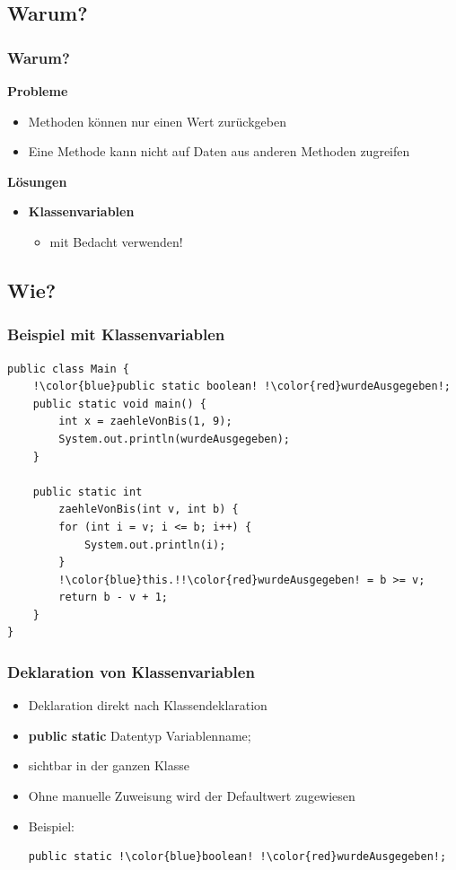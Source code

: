 \documentclass[final]{beamer}
\begin{document}
\subsection{Warum?}
\begin{frame}
	\frametitle{Warum?}
	\textbf{Probleme}
	\begin{itemize}
		\item{Methoden können nur einen Wert zurückgeben}
		\item{Eine Methode kann nicht auf Daten aus anderen Methoden zugreifen}
	\end{itemize}
	\vspace{\baselineskip}
	\pause
	\textbf{Lösungen}
	\pause
	\begin{itemize}
		\item{\textbf{Klassenvariablen}
			\begin{itemize}
				\item{mit Bedacht verwenden!}
			\end{itemize}
		}
	\end{itemize}
\end{frame}
	
\subsection{Wie?}
\begin{frame}[containsverbatim]
	\frametitle{Beispiel mit Klassenvariablen}
	\begin{lstlisting}[escapechar=!]
public class Main {
	!\color{blue}public static boolean! !\color{red}wurdeAusgegeben!;
	public static void main() {
		int x = zaehleVonBis(1, 9);
		System.out.println(wurdeAusgegeben);
	}
	
	public static int 
		zaehleVonBis(int v, int b) {
		for (int i = v; i <= b; i++) {
			System.out.println(i);
		}
		!\color{blue}this.!!\color{red}wurdeAusgegeben! = b >= v;
		return b - v + 1;
	}
}
	\end{lstlisting}
\end{frame}

\begin{frame}[containsverbatim]
	\frametitle{Deklaration von Klassenvariablen}
	\begin{itemize}
		\item{Deklaration direkt nach Klassendeklaration}
		\item{\textbf{public static} {\color{blue}Datentyp} {\color{red}Variablenname};}
		\item{sichtbar in der ganzen Klasse}
		\item{Ohne manuelle Zuweisung wird der Defaultwert zugewiesen}
		\item{Beispiel:
			\begin{lstlisting}[escapechar=!]
public static !\color{blue}boolean! !\color{red}wurdeAusgegeben!;
			\end{lstlisting}
		}
	\end{itemize}
\end{frame}
\end{document}
